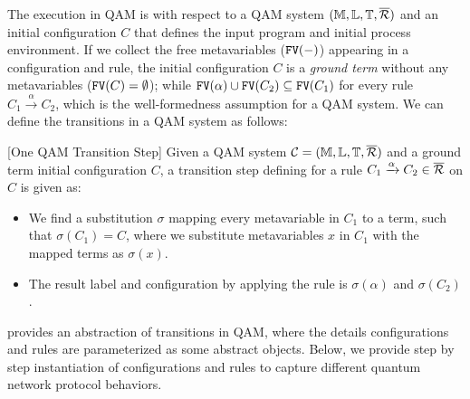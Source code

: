 The execution in QAM is with respect to a QAM system $(\mathbb{M},\mathbb{L},\mathbb{T},\overline{\mathcal{R}})$ and an initial configuration $C$ that defines the input program and initial process environment.
If we collect the free metavariables ($\texttt{FV}(-)$) appearing in a configuration and rule, 
the initial configuration $C$ is a \textit{ground term} without any metavariables ($\texttt{FV}(C)=\emptyset$);
while $\texttt{FV}(\alpha) \cup \texttt{FV}(C_2)\subseteq \texttt{FV}(C_1)$ for every rule $C_1 \xrightarrow{\alpha} C_2$, which is the well-formedness assumption for a QAM system.
We can define the transitions in a QAM system as follows:

\begin{definition}\label{def:labeledsystem}\rm[One QAM Transition Step]
Given a QAM system $\mathcal{C}=(\mathbb{M},\mathbb{L},\mathbb{T},\overline{\mathcal{R}})$ and a ground term initial configuration $C$, a transition step defining for a rule $C_1 \xrightarrow{\alpha} C_2 \in \overline{\mathcal{R}}$ on $C$ is given as:
\begin{itemize}
\item We find a substitution $\sigma$ mapping every metavariable in $C_1$ to a term, such that $\sigma(C_1)=C$, where we substitute metavariables $x$ in $C_1$ with the mapped terms as $\sigma(x)$.
\item The result label and configuration by applying the rule is $\sigma(\alpha)$ and $\sigma(C_2)$.
\end{itemize}
\end{definition}

 provides an abstraction of transitions in QAM, where the details configurations and rules are parameterized as some abstract objects. Below, we provide step by step instantiation of configurations and rules to capture different quantum network protocol behaviors. 


